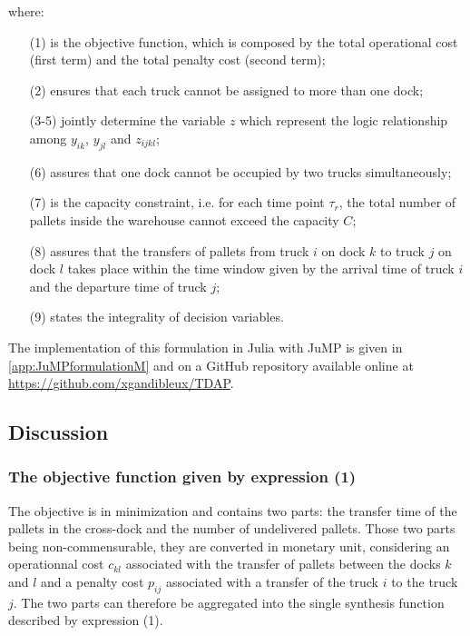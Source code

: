 \documentclass[preprint,12pt,authoryear]{elsarticle}
\begin{document}
\medskip
\noindent
where:
\begin{itemize}
    \item [(1)] is the objective function, which is composed by the total operational cost (first term) and the total penalty cost (second term);
    \item [(2)] ensures that each truck cannot be assigned to more than one dock;     
    \item [(3-5)] jointly determine the variable $z$ which represent the logic relationship among $y_{ik}$, $y_{jl}$ and $z_{ijkl}$;
    \item [(6)] assures that one dock cannot be occupied by two trucks simultaneously;
    \item [(7)] is the capacity constraint, i.e. for each time point $\tau_r$, the total number of pallets inside the warehouse cannot exceed the capacity $C$;
    \item [(8)] assures that the transfers of pallets from truck $i$ on dock $k$ to truck $j$ on dock $l$ takes place within the time window given by the arrival time of truck $i$ and the departure time of truck $j$;
    \item [(9)] states the integrality of decision variables. 
\end{itemize}
\medskip
The implementation of this formulation in Julia with JuMP is given in \ref{app:JuMPformulationM} and on a GitHub repository available online at \url{https://github.com/xgandibleux/TDAP}.

%
%
\subsection{Discussion}\label{sec:discussionM}
\smallskip

%
%
\subsubsection{The objective function given by expression (1)}

The objective is in minimization and contains two parts: the transfer time of the pallets in the cross-dock and the number of undelivered pallets. Those two parts being non-commensurable, they are converted in monetary unit, considering an operationnal cost $c_{kl}$ associated with the transfer of pallets between the docks $k$ and $l$ and a penalty cost $p_{ij}$ associated with a transfer of the truck $i$ to the truck $j$. The two parts can therefore be aggregated into the single synthesis function described by expression (1).
\end{document}
